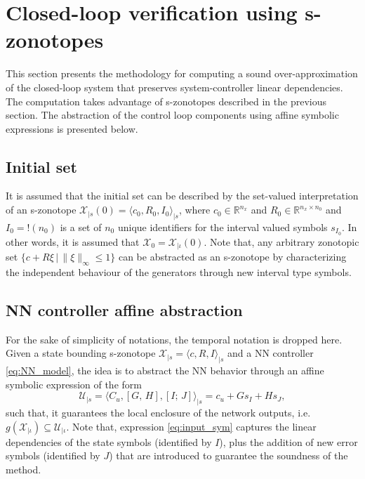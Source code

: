 \documentclass[journal]{IEEEtran}
\begin{document}

\section{Closed-loop verification using s-zonotopes} \label{sec:verification}

This section presents the methodology for computing a
sound over-approximation of the closed-loop system that preserves system-controller linear dependencies. The computation takes advantage of s-zonotopes described in the previous section. The abstraction of the control loop components using affine symbolic expressions is presented below.


\subsection{Initial set} \label{sec:initial_set}

It is assumed that the initial set can be described by the set-valued interpretation of an s-zonotope $\mathcal{X}_{|s}{(0)} = \langle c_0, R_0, I_0 \rangle_{|s}$, where $c_0\in \mathbb{R}^{n_x}$ and $R_0 \in \mathbb{R}^{n_x \times n_0}$ and  $I_{0} = !(n_0)$ is a set of $n_0$ unique identifiers  for the interval valued symbols $s_{I_0}$. In other words, it is assumed that $\mathcal{X}_0 = \mathcal{X}_{|\iota}(0)$. Note that, any arbitrary zonotopic set $\{c +R \xi \, | \,  \|\xi\|_\infty \leq 1\}$ can be abstracted as an s-zonotope by characterizing the independent behaviour of the generators through new interval type symbols.


\subsection{NN controller affine abstraction} \label{sec:controller_abs_linear}

For the sake of simplicity of notations, the temporal notation is dropped here. Given a state bounding s-zonotope $\mathcal{X}_{|s} = \langle c, R, I \rangle_{|s}$ and a NN controller \eqref{eq:NN_model}, the idea is to abstract the NN behavior through  an affine symbolic expression of the form \begin{equation} \label{eq:input_sym}
 \mathcal{U}_{|s}  = \langle C_u, [G, \,H], [I; \, J]\rangle_{|s} =c_u + Gs_I + Hs_{J},
\end{equation}
\noindent such that, it guarantees the local enclosure of the network outputs, i.e. $g(\mathcal{X}_{|\iota}) \subseteq \mathcal{U}_{|\iota}$. Note that,  expression \eqref{eq:input_sym} captures the linear dependencies of the state symbols (identified by $I$), plus the addition of new error symbols (identified by $J$) that are introduced to guarantee the soundness of the method. 
\end{document}
